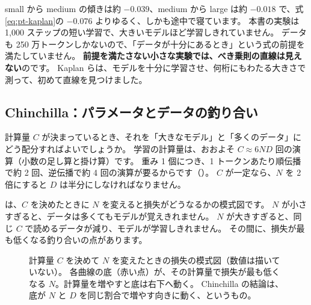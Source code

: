 small から medium の傾きは約 $-0.039$、medium から large は約 $-0.018$ で、式\eqref{eq:pt-kaplan}の $-0.076$ よりゆるく、しかも途中で寝ています。
本書の実験は 1,000 ステップの短い学習で、大きいモデルほど学習しきれていません。
データも 250 万トークンしかないので、「データが十分にあるとき」という式の前提を満たしていません。
\textbf{前提を満たさない小さな実験では、べき乗則の直線は見えない}のです。
Kaplan らは、モデルを十分に学習させ、何桁にもわたる大きさで測って、初めて直線を見つけました。

\subsection{Chinchilla：パラメータとデータの釣り合い}

計算量 $C$ が決まっているとき、それを「大きなモデル」と「多くのデータ」にどう配分すればよいでしょうか。
学習の計算量は、おおよそ $C\approx 6ND$ 回の演算（小数の足し算と掛け算）です。
重み 1 個につき、1 トークンあたり順伝播で約 2 回、逆伝播で約 4 回の演算が要るからです（）。
$C$ が一定なら、$N$ を 2 倍にすると $D$ は半分にしなければなりません。

は、$C$ を決めたときに $N$ を変えると損失がどうなるかの模式図です。
$N$ が小さすぎると、データは多くてもモデルが覚えきれません。
$N$ が大きすぎると、同じ $C$ で読めるデータが減り、モデルが学習しきれません。
その間に、損失が最も低くなる釣り合いの点があります。

\begin{figure}[tbp]
\centering
{}
\caption{計算量 $C$ を決めて $N$ を変えたときの損失の模式図（数値は描いていない）。
各曲線の底（赤い点）が、その計算量で損失が最も低くなる $N$。計算量を増やすと底は右下へ動く。
Chinchilla の結論は、底が $N$ と $D$ を同じ割合で増やす向きに動く、というもの。}
\label{fig:pt-isoflop}
\end{figure}

